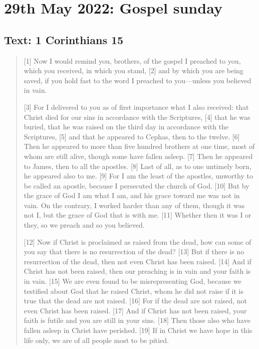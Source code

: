 \section{29th May 2022: Gospel sunday}
\subsection*{Text: 1 Corinthians 15}
  \begin{quote}
    [1] Now I would remind you, brothers, of the gospel I preached to you, which you received, in which you stand, [2] and by which you are being saved, if you hold fast to the word I preached to you—unless you believed in vain.

    [3] For I delivered to you as of first importance what I also received: that Christ died for our sins in accordance with the Scriptures, [4] that he was buried, that he was raised on the third day in accordance with the Scriptures, [5] and that he appeared to Cephas, then to the twelve. [6] Then he appeared to more than five hundred brothers at one time, most of whom are still alive, though some have fallen asleep. [7] Then he appeared to James, then to all the apostles. [8] Last of all, as to one untimely born, he appeared also to me. [9] For I am the least of the apostles, unworthy to be called an apostle, because I persecuted the church of God. [10] But by the grace of God I am what I am, and his grace toward me was not in vain. On the contrary, I worked harder than any of them, though it was not I, but the grace of God that is with me. [11] Whether then it was I or they, so we preach and so you believed.

    [12] Now if Christ is proclaimed as raised from the dead, how can some of you say that there is no resurrection of the dead? [13] But if there is no resurrection of the dead, then not even Christ has been raised. [14] And if Christ has not been raised, then our preaching is in vain and your faith is in vain. [15] We are even found to be misrepresenting God, because we testified about God that he raised Christ, whom he did not raise if it is true that the dead are not raised. [16] For if the dead are not raised, not even Christ has been raised. [17] And if Christ has not been raised, your faith is futile and you are still in your sins. [18] Then those also who have fallen asleep in Christ have perished. [19] If in Christ we have hope in this life only, we are of all people most to be pitied.


\end{quote}
